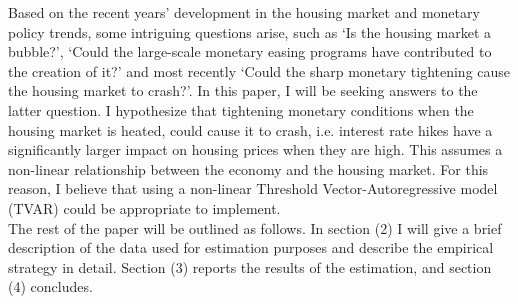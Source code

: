 \documentclass[12pt,a4paper]{article}
\begin{document}
\noindent Based on the recent years’ development in the housing market and monetary policy trends, some intriguing questions arise, such as ‘Is the housing market a bubble?’, ‘Could the large-scale monetary easing programs have contributed to the creation of it?’ and most recently ‘Could the sharp monetary tightening cause the housing market to crash?’.  In this paper, I will be seeking answers to the latter question. I hypothesize that tightening monetary conditions when the housing market is heated, could cause it to crash, i.e. interest rate hikes have a significantly larger impact on housing prices when they are high. This assumes a non-linear relationship between the economy and the housing market. For this reason, I believe that using a non-linear Threshold Vector-Autoregressive model (TVAR) could be appropriate to implement.\\  

\noindent The rest of the paper will be outlined as follows. In section (2) I will give a brief description of the data used for estimation purposes and describe the empirical strategy in detail. Section (3) reports the results of the estimation, and section (4) concludes.
\end{document}
